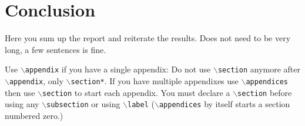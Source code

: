\documentclass[conference]{IEEEtran}
\begin{document}
\section{Conclusion}
\label{Section:Conclusion}
Here you sum up the report and reiterate the results. Does not need to be very long, a few sentences is fine.


\printbibliography

{
	Use $\backslash${\tt{appendix}} if you have a single appendix:
	Do not use $\backslash${\tt{section}} anymore after $\backslash${\tt{appendix}}, only $\backslash${\tt{section*}}.
	If you have multiple appendixes use $\backslash${\tt{appendices}} then use $\backslash${\tt{section}} to start each appendix.
	You must declare a $\backslash${\tt{section}} before using any $\backslash${\tt{subsection}} or using $\backslash${\tt{label}} ($\backslash${\tt{appendices}} by itself
	starts a section numbered zero.)}

\end{document}
